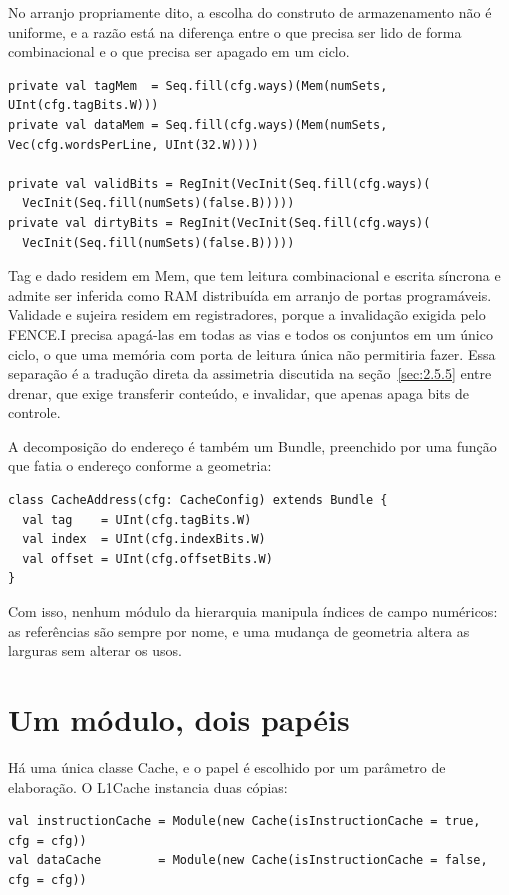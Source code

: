 No arranjo propriamente dito, a escolha do construto de armazenamento não é uniforme, e a razão está na diferença entre o que precisa ser lido de forma combinacional e o que precisa ser apagado em um ciclo.


{\footnotesize
\begin{verbatim}
private val tagMem  = Seq.fill(cfg.ways)(Mem(numSets, UInt(cfg.tagBits.W)))
private val dataMem = Seq.fill(cfg.ways)(Mem(numSets, Vec(cfg.wordsPerLine, UInt(32.W))))

private val validBits = RegInit(VecInit(Seq.fill(cfg.ways)(
  VecInit(Seq.fill(numSets)(false.B)))))
private val dirtyBits = RegInit(VecInit(Seq.fill(cfg.ways)(
  VecInit(Seq.fill(numSets)(false.B)))))
\end{verbatim}
}


Tag e dado residem em Mem, que tem leitura combinacional e escrita síncrona e admite ser inferida como RAM distribuída em arranjo de portas programáveis. Validade e sujeira residem em registradores, porque a invalidação exigida pelo FENCE.I precisa apagá-las em todas as vias e todos os conjuntos em um único ciclo, o que uma memória com porta de leitura única não permitiria fazer. Essa separação é a tradução direta da assimetria discutida na seção~\ref{sec:2.5.5} entre drenar, que exige transferir conteúdo, e invalidar, que apenas apaga bits de controle.

A decomposição do endereço é também um Bundle, preenchido por uma função que fatia o endereço conforme a geometria:


{\footnotesize
\begin{verbatim}
class CacheAddress(cfg: CacheConfig) extends Bundle {
  val tag    = UInt(cfg.tagBits.W)
  val index  = UInt(cfg.indexBits.W)
  val offset = UInt(cfg.offsetBits.W)
}
\end{verbatim}
}


Com isso, nenhum módulo da hierarquia manipula índices de campo numéricos: as referências são sempre por nome, e uma mudança de geometria altera as larguras sem alterar os usos.

\section{Um módulo, dois papéis}\label{sec:5.4}

Há uma única classe Cache, e o papel é escolhido por um parâmetro de elaboração. O L1Cache instancia duas cópias:


{\footnotesize
\begin{verbatim}
val instructionCache = Module(new Cache(isInstructionCache = true,  cfg = cfg))
val dataCache        = Module(new Cache(isInstructionCache = false, cfg = cfg))
\end{verbatim}
}


